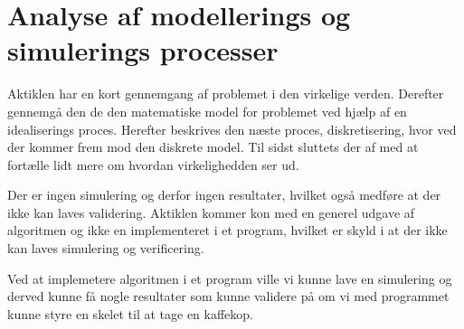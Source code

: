 \section{Analyse af modellerings og simulerings processer}
Aktiklen har en kort gennemgang af problemet i den virkelige verden. Derefter
gennemgå den de den matematiske model for problemet ved hjælp af en
idealiserings proces. Herefter beskrives den næste proces, diskretisering, hvor
ved der kommer frem mod den diskrete model. Til sidst sluttets der af med at
fortælle lidt mere om hvordan virkelighedden ser ud.

Der er ingen simulering og derfor ingen resultater, hvilket også medføre at
der ikke kan laves validering. Aktiklen kommer kon med en generel udgave af
algoritmen og ikke en implementeret i et program, hvilket er skyld i at der
ikke kan laves simulering og verificering.


Ved at implemetere algoritmen i et program ville vi kunne lave en simulering og
derved kunne få nogle resultater som kunne validere på om vi med programmet
kunne styre en skelet til at tage en kaffekop.

